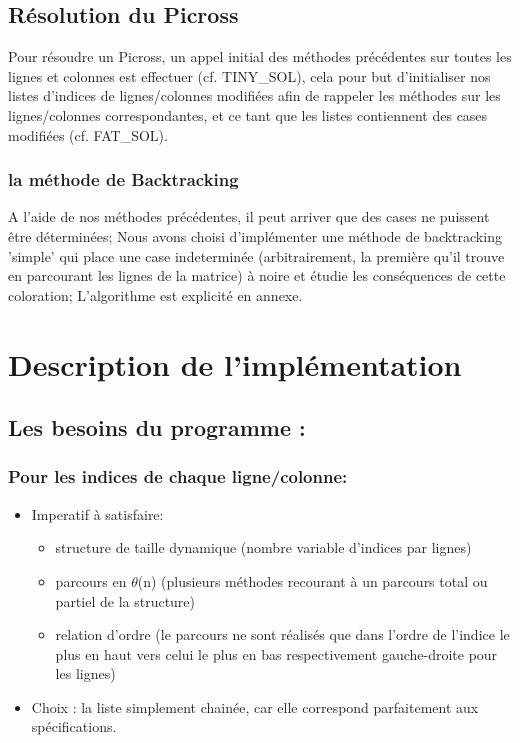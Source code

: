\documentclass{article}
\begin{document}
\subsection{Résolution du Picross}
Pour résoudre un Picross, un appel initial des méthodes précédentes sur toutes les lignes et colonnes est effectuer (cf. TINY\_SOL), cela pour but d'initialiser nos listes d'indices de lignes/colonnes modifiées afin de rappeler les méthodes sur les lignes/colonnes correspondantes, et ce tant que les listes contiennent des cases modifiées (cf. FAT\_SOL).
\subsubsection{la méthode de Backtracking}
A l'aide de nos méthodes précédentes, il peut arriver que des cases ne puissent être déterminées;\newline
Nous avons choisi d'implémenter une méthode de backtracking 'simple' qui place une case indeterminée (arbitrairement, la première qu'il trouve en parcourant les lignes de la matrice) à noire et étudie les conséquences de cette coloration;
L'algorithme est explicité en annexe.
\section{Description de l'implémentation}
\subsection{Les besoins du programme :}
\subsubsection{Pour les indices de chaque ligne/colonne:}
\begin{itemize}
\item Imperatif à satisfaire:
\begin{itemize}
\item structure de taille dynamique (nombre variable d'indices par lignes)
\item parcours en $\theta$(n) (plusieurs méthodes recourant à un parcours total ou partiel de la structure)
\item relation d'ordre (le parcours ne sont réalisés que dans l'ordre de l'indice le plus en haut vers celui le plus en bas respectivement gauche-droite pour les lignes)
\end{itemize}
\item Choix : la liste simplement chainée, car elle correspond parfaitement aux spécifications.
\end{itemize}
\end{document}
